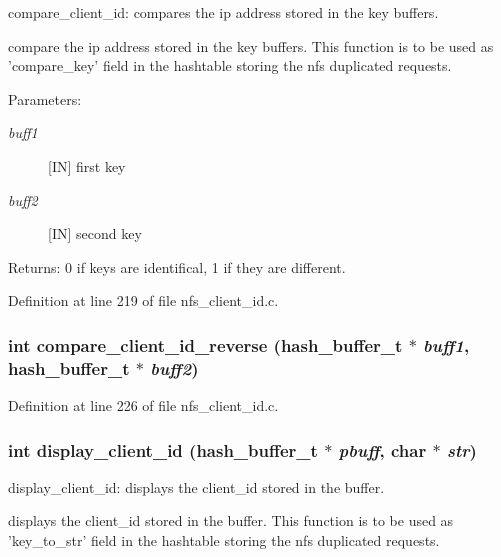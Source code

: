 compare\_\-client\_\-id: compares the ip address stored in the key buffers.

compare the ip address stored in the key buffers. This function is to be used as 'compare\_\-key' field in the hashtable storing the nfs duplicated requests.

\begin{Desc}
\item[Parameters:]
\begin{description}
\item[{\em buff1}][IN] first key \item[{\em buff2}][IN] second key\end{description}
\end{Desc}
\begin{Desc}
\item[Returns:]0 if keys are identifical, 1 if they are different. \end{Desc}


Definition at line 219 of file nfs\_\-client\_\-id.c.
\subsubsection{\setlength{\rightskip}{0pt plus 5cm}int compare\_\-client\_\-id\_\-reverse (hash\_\-buffer\_\-t $\ast$ {\em buff1}, hash\_\-buffer\_\-t $\ast$ {\em buff2})}\label{nfs__client__id_8c_a9}




Definition at line 226 of file nfs\_\-client\_\-id.c.
\subsubsection{\setlength{\rightskip}{0pt plus 5cm}int display\_\-client\_\-id (hash\_\-buffer\_\-t $\ast$ {\em pbuff}, char $\ast$ {\em str})}\label{nfs__client__id_8c_a10}


display\_\-client\_\-id: displays the client\_\-id stored in the buffer.

displays the client\_\-id stored in the buffer. This function is to be used as 'key\_\-to\_\-str' field in the hashtable storing the nfs duplicated requests.

